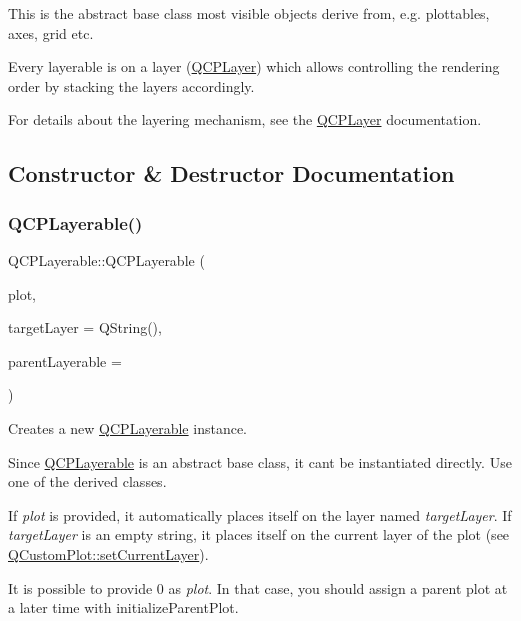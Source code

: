 This is the abstract base class most visible objects derive from, e.\+g. plottables, axes, grid etc.

Every layerable is on a layer (\hyperlink{classQCPLayer}{Q\+C\+P\+Layer}) which allows controlling the rendering order by stacking the layers accordingly.

For details about the layering mechanism, see the \hyperlink{classQCPLayer}{Q\+C\+P\+Layer} documentation. 

\subsection{Constructor \& Destructor Documentation}
\mbox{\label{classQCPLayerable_a74c0fa237f29bf0e49565013fc5d1ec0}} 
\subsubsection{\texorpdfstring{Q\+C\+P\+Layerable()}{QCPLayerable()}}
{\footnotesize\ttfamily Q\+C\+P\+Layerable\+::\+Q\+C\+P\+Layerable (\begin{DoxyParamCaption}\item[{\hyperlink{classQCustomPlot}{Q\+Custom\+Plot} $\ast$}]{plot,  }\item[{Q\+String}]{target\+Layer = {\ttfamily QString()},  }\item[{\hyperlink{classQCPLayerable}{Q\+C\+P\+Layerable} $\ast$}]{parent\+Layerable = {} }\end{DoxyParamCaption})}

Creates a new \hyperlink{classQCPLayerable}{Q\+C\+P\+Layerable} instance.

Since \hyperlink{classQCPLayerable}{Q\+C\+P\+Layerable} is an abstract base class, it can\textquotesingle{}t be instantiated directly. Use one of the derived classes.

If {\itshape plot} is provided, it automatically places itself on the layer named {\itshape target\+Layer}. If {\itshape target\+Layer} is an empty string, it places itself on the current layer of the plot (see \hyperlink{classQCustomPlot_a73a6dc47c653bb6f8f030abca5a11852}{Q\+Custom\+Plot\+::set\+Current\+Layer}).

It is possible to provide 0 as {\itshape plot}. In that case, you should assign a parent plot at a later time with initialize\+Parent\+Plot.

